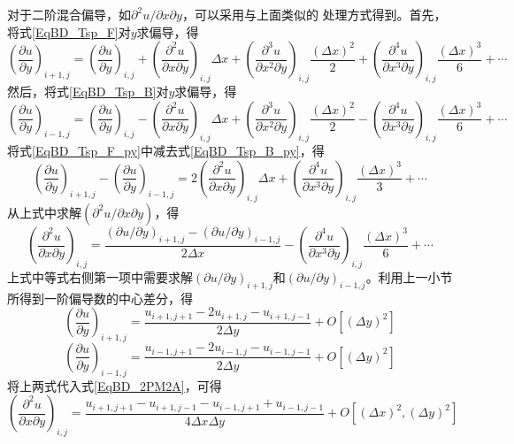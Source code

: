 对于二阶混合偏导，如$\partial^{2} u/\partial x\partial y$，可以采用与上面类似的
处理方式得到。首先，将式\eqref{EqBD_Tsp_F}对$y$求偏导，得
\begin{equation}
  \left(
    \frac{\partial u}{\partial y}
  \right)_{i+1,j}
  =
  \left(
    \frac{\partial u}{\partial y}
  \right)_{i,j}
  +
  \left(
    \frac{\partial^{2} u}{\partial x\partial y}
  \right)_{i,j}\Delta x
  +
  \left(
    \frac{\partial^{3} u}{\partial x^{2}\partial y}
  \right)_{i,j}\frac{(\Delta x)^{2}}{2} 
  +
  \left(
    \frac{\partial^{4} u}{\partial x^{3}\partial y}
  \right)_{i,j}\frac{(\Delta x)^{3}}{6} 
  +
  \cdots
  \label{EqBD_Tsp_F_py}
\end{equation}
然后，将式\eqref{EqBD_Tsp_B}对$y$求偏导，得
\begin{equation}
  \left(
    \frac{\partial u}{\partial y}
  \right)_{i-1,j}
  =
  \left(
    \frac{\partial u}{\partial y}
  \right)_{i,j}
  -
  \left(
    \frac{\partial^{2} u}{\partial x\partial y}
  \right)_{i,j}\Delta x
  +
  \left(
    \frac{\partial^{3} u}{\partial x^{2}\partial y}
  \right)_{i,j}\frac{(\Delta x)^{2}}{2} 
  -
  \left(
    \frac{\partial^{4} u}{\partial x^{3}\partial y}
  \right)_{i,j}\frac{(\Delta x)^{3}}{6} 
  +
  \cdots
  \label{EqBD_Tsp_B_py}
\end{equation}
将式\eqref{EqBD_Tsp_F_py}中减去式\eqref{EqBD_Tsp_B_py}，得
\begin{equation}
  \left(
    \frac{\partial u}{\partial y}
  \right)_{i+1,j}
  -
  \left(
    \frac{\partial u}{\partial y}
  \right)_{i-1,j}
  =
  2
  \left(
    \frac{\partial^{2} u}{\partial x\partial y}
  \right)_{i,j}\Delta x
  +
  \left(
    \frac{\partial^{4} u}{\partial x^{3}\partial y}
  \right)_{i,j}\frac{(\Delta x)^{3}}{3} 
  +
  \cdots
\end{equation}
从上式中求解$(\partial^{2}u/\partial x\partial y)$，得
\begin{equation}
  \left(
    \frac{\partial^{2} u}{\partial x\partial y}
  \right)_{i,j}
  =
  \frac{(\partial u/\partial y)_{i+1,j}-(\partial u/\partial y)_{i-1,j}}{2\Delta x}
  -
  \left(
    \frac{\partial^{4} u}{\partial x^{3}\partial y}
  \right)_{i,j}\frac{(\Delta x)^{3}}{6} 
  +
  \cdots
  \label{EqBD_2PM2A}
\end{equation}
上式中等式右侧第一项中需要求解$(\partial u/\partial y)_{i+1,j}$和$(\partial
u/\partial y)_{i-1,j}$。利用上一小节所得到一阶偏导数的中心差分，得
\begin{equation}
  \left(
    \frac{\partial u}{\partial y}
  \right)_{i+1,j}
  =
  \frac{u_{i+1,j+1}-2u_{i+1,j}-u_{i+1,j-1}}{2\Delta y} + O[(\Delta y)^{2}]
\end{equation}
\begin{equation}
  \left(
    \frac{\partial u}{\partial y}
  \right)_{i-1,j}
  =
\frac{u_{i-1,j+1}-2u_{i-1,j}-u_{i-1,j-1}}{2\Delta y} + O[(\Delta y)^{2}]
\end{equation}
将上两式代入式\eqref{EqBD_2PM2A}，可得
\begin{equation}
  \left(
    \frac{\partial^{2} u}{\partial x\partial y}
  \right)_{i,j}
  =
  \frac{u_{i+1,j+1}-u_{i+1,j-1}-u_{i-1,j+1}+u_{i-1,j-1}}{4\Delta x\Delta y}
  +
  O[(\Delta x)^{2},(\Delta y)^{2}]
\end{equation}

